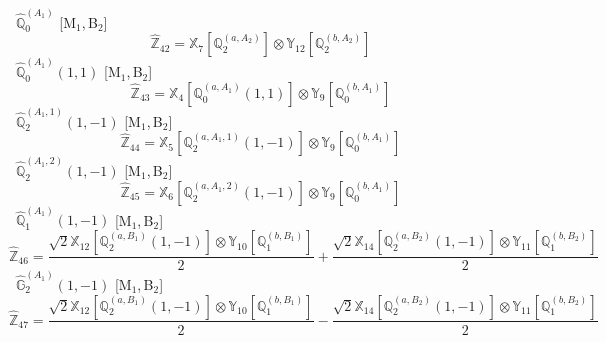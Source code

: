 \documentclass[fleqn,10pt,landscape]{article}
\begin{document}
\begin{itemize}
\begin{dmath*}
\end{dmath*}
\vspace{4mm}
\noindent {} $\,\,\,\hat{\mathbb{Q}}_{0}^{(A_{1})}$ [M$_{1}$,\,B$_{2}$]
\begin{dmath*}
\hat{\mathbb{Z}}_{42}=\mathbb{X}_{7}[\mathbb{Q}_{2}^{(a,A_{2})}] \otimes\mathbb{Y}_{12}[\mathbb{Q}_{2}^{(b,A_{2})}]
\end{dmath*}
\vspace{4mm}
\noindent {} $\,\,\,\hat{\mathbb{Q}}_{0}^{(A_{1})}(1,1)$ [M$_{1}$,\,B$_{2}$]
\begin{dmath*}
\hat{\mathbb{Z}}_{43}=\mathbb{X}_{4}[\mathbb{Q}_{0}^{(a,A_{1})}(1,1)] \otimes\mathbb{Y}_{9}[\mathbb{Q}_{0}^{(b,A_{1})}]
\end{dmath*}
\vspace{4mm}
\noindent {} $\,\,\,\hat{\mathbb{Q}}_{2}^{(A_{1},1)}(1,-1)$ [M$_{1}$,\,B$_{2}$]
\begin{dmath*}
\hat{\mathbb{Z}}_{44}=\mathbb{X}_{5}[\mathbb{Q}_{2}^{(a,A_{1},1)}(1,-1)] \otimes\mathbb{Y}_{9}[\mathbb{Q}_{0}^{(b,A_{1})}]
\end{dmath*}
\vspace{4mm}
\noindent {} $\,\,\,\hat{\mathbb{Q}}_{2}^{(A_{1},2)}(1,-1)$ [M$_{1}$,\,B$_{2}$]
\begin{dmath*}
\hat{\mathbb{Z}}_{45}=\mathbb{X}_{6}[\mathbb{Q}_{2}^{(a,A_{1},2)}(1,-1)] \otimes\mathbb{Y}_{9}[\mathbb{Q}_{0}^{(b,A_{1})}]
\end{dmath*}
\vspace{4mm}
\noindent {} $\,\,\,\hat{\mathbb{Q}}_{1}^{(A_{1})}(1,-1)$ [M$_{1}$,\,B$_{2}$]
\begin{dmath*}
\hat{\mathbb{Z}}_{46}=\frac{\sqrt{2} \mathbb{X}_{12}[\mathbb{Q}_{2}^{(a,B_{1})}(1,-1)] \otimes\mathbb{Y}_{10}[\mathbb{Q}_{1}^{(b,B_{1})}]}{2} + \frac{\sqrt{2} \mathbb{X}_{14}[\mathbb{Q}_{2}^{(a,B_{2})}(1,-1)] \otimes\mathbb{Y}_{11}[\mathbb{Q}_{1}^{(b,B_{2})}]}{2}
\end{dmath*}
\vspace{4mm}
\noindent {} $\,\,\,\hat{\mathbb{G}}_{2}^{(A_{1})}(1,-1)$ [M$_{1}$,\,B$_{2}$]
\begin{dmath*}
\hat{\mathbb{Z}}_{47}=\frac{\sqrt{2} \mathbb{X}_{12}[\mathbb{Q}_{2}^{(a,B_{1})}(1,-1)] \otimes\mathbb{Y}_{10}[\mathbb{Q}_{1}^{(b,B_{1})}]}{2} - \frac{\sqrt{2} \mathbb{X}_{14}[\mathbb{Q}_{2}^{(a,B_{2})}(1,-1)] \otimes\mathbb{Y}_{11}[\mathbb{Q}_{1}^{(b,B_{2})}]}{2}
\end{dmath*}
\vspace{4mm}

\end{itemize}
\end{document}
